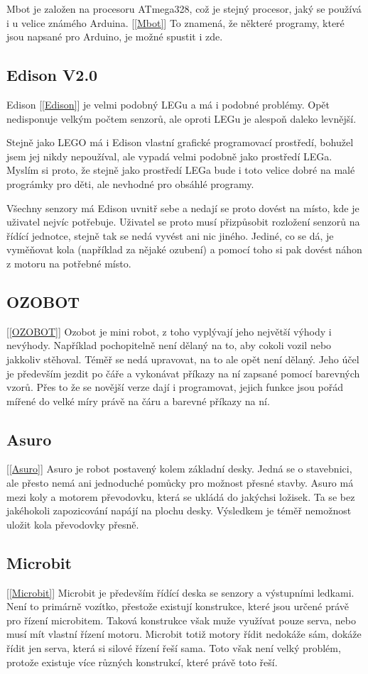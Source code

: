\documentclass{template/socthesis}
\begin{document}
Mbot je založen na procesoru ATmega328, což je stejný procesor, jaký se používá i u velice známého Arduina. [\ref{Mbot}]
To znamená, že některé programy, které jsou napsané pro Arduino, je možné spustit i zde.

\subsection{Edison V2.0}
Edison [\ref{Edison}]
je velmi podobný LEGu a má i podobné problémy. Opět nedisponuje velkým počtem senzorů, ale oproti LEGu je alespoň daleko levnější. 

Stejně jako LEGO má i Edison vlastní grafické programovací prostředí, bohužel jsem jej nikdy nepoužíval, ale vypadá velmi podobně jako prostředí LEGa. Myslím si proto, že stejně jako prostředí LEGa bude i toto velice dobré na malé prográmky pro děti, ale nevhodné pro obsáhlé programy.

Všechny senzory má Edison uvnitř sebe a nedají se proto dovést na místo, kde je uživatel nejvíc potřebuje. Uživatel se proto musí přizpůsobit rozložení senzorů na řídící jednotce, stejně tak se nedá vyvést ani nic jiného. Jediné, co se dá, je vyměňovat kola (například za nějaké ozubení) a pomocí toho si pak dovést náhon z motoru na potřebné místo.

\subsection{OZOBOT }[\ref{OZOBOT}]
Ozobot je mini robot, z toho vyplývají jeho největší výhody i nevýhody. Například pochopitelně není dělaný na to, aby cokoli vozil nebo jakkoliv stěhoval. Téměř se nedá upravovat, na to ale opět není dělaný. Jeho účel je především jezdit po čáře a vykonávat příkazy na ní zapsané pomocí barevných vzorů. Přes to že se novější verze dají i programovat, jejich funkce jsou pořád mířené do velké míry právě na čáru a barevné příkazy na ní.

\subsection{Asuro} [\ref{Asuro}]
Asuro je robot postavený kolem základní desky. Jedná se o stavebnici, ale přesto nemá ani jednoduché pomůcky pro možnost přesné stavby. Asuro má mezi koly a motorem převodovku, která se ukládá do jakýchsi ložisek. Ta se bez jakéhokoli zapozicování napájí na plochu desky. Výsledkem je téměř nemožnost uložit kola převodovky přesně.


\subsection{Microbit }[\ref{Microbit}]
Microbit je především řídící deska se senzory a výstupními ledkami. Není to primárně vozítko, přestože existují konstrukce, které jsou určené právě pro řízení microbitem. Taková konstrukce však muže využívat pouze serva, nebo musí mít vlastní řízení motoru. Microbit totiž motory řídit nedokáže sám, dokáže řídit jen serva, která si silové řízení řeší sama. Toto však není velký problém, protože existuje více různých konstrukcí, které právě toto řeší. 
\end{document}
